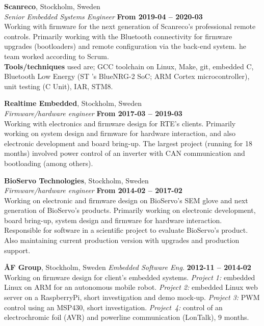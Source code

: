 \documentclass[a4paper,margin,line]{res} \usepackage{latexsym}
\begin{document}
\begin{resume}
{\bf Scanreco}, Stockholm, Sweden\\
{\em Senior Embedded Systems Engineer} \hfill {\bf From 2019-04 --
  2020-03}\\ Working with firmware for the next generation of
Scanreco's professional remote controls. Primarily working with the
Bluetooth connectivity for firmware upgrades (bootloaders) and remote
configuration via the back-end system. he team worked according to
Scrum. \\ {\bf Tools/techniques} used are; GCC toolchain on Linux, Make, git,
embedded C, Bluetooth Low Energy (ST 's BlueNRG-2 SoC; ARM Cortex
microcontroller), unit testing (C Unit), IAR, STM8.

{\bf Realtime Embedded}, Stockholm, Sweden\\
{\em Firmware/hardware engineer} \hfill {\bf From 2017-03 --
  2019-03}\\ Working with electronics and firmware design for RTE's
clients. Primarily working on system design and firmware for hardware
interaction, and also electronic development and board bring-up. The
largest project (running for 18 months) involved power control of an
inverter with CAN communication and bootloading (among others).

{\bf BioServo Technologies}, Stockholm, Sweden\\
{\em Firmware/hardware engineer} \hfill {\bf From 2014-02 --
  2017-02}\\ Working on electronic and firmware design on BioServo's
SEM glove and next generation of BioServo's products.  Primarily
working on electronic development, board bring-up, system design and
firmware for hardware interaction. Responsible for software in a
scientific project to evaluate BioServo's product.  Also maintaining
current production version with upgrades and production support.


{\bf {\AA}F Group}, Stockholm, Sweden
{\em Embedded Software Eng.} \hfill {\bf 2012-11 -- 2014-02}\\ Working
on firmware design for client's embedded systems.  {\em Project 1:}
embedded Linux on ARM for an autonomous mobile robot.  {\em Project
  2:} embedded Linux web server on a RaspberryPi, short investigation
and demo mock-up.  {\em Project 3:} PWM control using an MSP430, short
investigation.  {\em Project~4:} control of an electrochromic foil
(AVR) and powerline communication (LonTalk), 9 months.


\end{resume}
\end{document}
